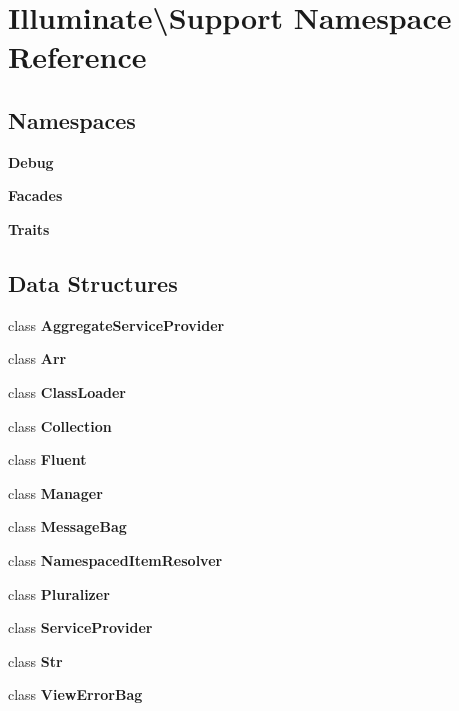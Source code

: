 \section{Illuminate\textbackslash{}Support Namespace Reference}
\label{namespace_illuminate_1_1_support}
\subsection*{Namespaces}
\begin{DoxyCompactItemize}
\item 
 {\bf Debug}
\item 
 {\bf Facades}
\item 
 {\bf Traits}
\end{DoxyCompactItemize}
\subsection*{Data Structures}
\begin{DoxyCompactItemize}
\item 
class {\bf Aggregate\+Service\+Provider}
\item 
class {\bf Arr}
\item 
class {\bf Class\+Loader}
\item 
class {\bf Collection}
\item 
class {\bf Fluent}
\item 
class {\bf Manager}
\item 
class {\bf Message\+Bag}
\item 
class {\bf Namespaced\+Item\+Resolver}
\item 
class {\bf Pluralizer}
\item 
class {\bf Service\+Provider}
\item 
class {\bf Str}
\item 
class {\bf View\+Error\+Bag}
\end{DoxyCompactItemize}
